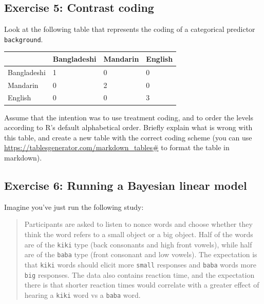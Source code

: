 \documentclass[
]{article}
\begin{document}
\newpage

\hypertarget{exercise-5-contrast-coding}{%
\subsection{Exercise 5: Contrast
coding}\label{exercise-5-contrast-coding}}

Look at the following table that represents the coding of a categorical
predictor \texttt{background}.

\begin{longtable}[]{@{}llll@{}}
\toprule()
& Bangladeshi & Mandarin & English \\
\midrule()
\endhead
Bangladeshi & 1 & 0 & 0 \\
Mandarin & 0 & 2 & 0 \\
English & 0 & 0 & 3 \\
\bottomrule()
\end{longtable}

Assume that the intention was to use treatment coding, and to order the
levels according to R's default alphabetical order. Briefly explain what
is wrong with this table, and create a new table with the correct coding
scheme (you can use \url{https://tablesgenerator.com/markdown_tables\#}
to format the table in markdown).

\newpage

\hypertarget{exercise-6-running-a-bayesian-linear-model}{%
\subsection{Exercise 6: Running a Bayesian linear
model}\label{exercise-6-running-a-bayesian-linear-model}}

Imagine you've just run the following study:

\begin{quote}
Participants are asked to listen to nonce words and choose whether they
think the word refers to a small object or a big object. Half of the
words are of the \texttt{kiki} type (back consonants and high front
vowels), while half are of the \texttt{baba} type (front consonant and
low vowels). The expectation is that \texttt{kiki} words should elicit
more \texttt{small} responses and \texttt{baba} words more \texttt{big}
responses. The data also contains reaction time, and the expectation
there is that shorter reaction times would correlate with a greater
effect of hearing a \texttt{kiki} word vs a \texttt{baba} word.
\end{quote}
\end{document}
